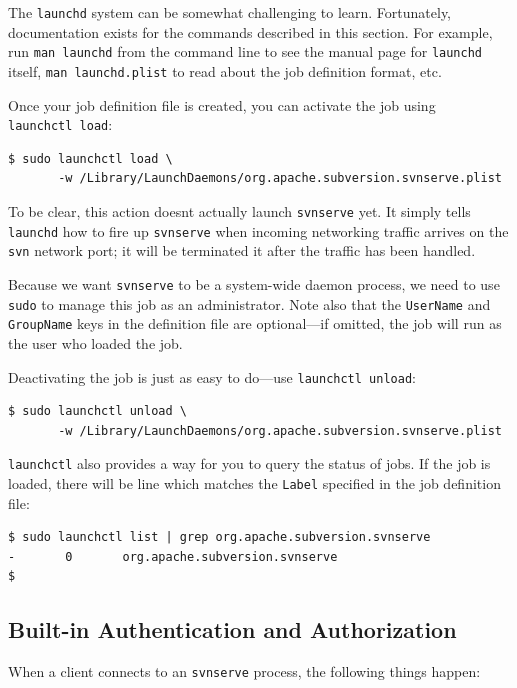 The \texttt{launchd} system can be somewhat challenging to learn.
Fortunately, documentation exists for the commands described in this
section. For example, run \texttt{man\ launchd} from the command line to
see the manual page for \texttt{launchd} itself,
\texttt{man\ launchd.plist} to read about the job definition format,
etc.

Once your job definition file is created, you can activate the job using
\texttt{launchctl\ load}:

\begin{verbatim}
$ sudo launchctl load \
       -w /Library/LaunchDaemons/org.apache.subversion.svnserve.plist
\end{verbatim}

To be clear, this action doesn\textquotesingle t actually launch
\texttt{svnserve} yet. It simply tells \texttt{launchd} how to fire up
\texttt{svnserve} when incoming networking traffic arrives on the
\texttt{svn} network port; it will be terminated it after the traffic
has been handled.

Because we want \texttt{svnserve} to be a system-wide daemon process, we
need to use \texttt{sudo} to manage this job as an administrator. Note
also that the \texttt{UserName} and \texttt{GroupName} keys in the
definition file are optional---if omitted, the job will run as the user
who loaded the job.

Deactivating the job is just as easy to do---use
\texttt{launchctl\ unload}:

\begin{verbatim}
$ sudo launchctl unload \
       -w /Library/LaunchDaemons/org.apache.subversion.svnserve.plist
\end{verbatim}

\texttt{launchctl} also provides a way for you to query the status of
jobs. If the job is loaded, there will be line which matches the
\texttt{Label} specified in the job definition file:

\begin{verbatim}
$ sudo launchctl list | grep org.apache.subversion.svnserve
-       0       org.apache.subversion.svnserve
$
\end{verbatim}

\subsection{Built-in Authentication and
Authorization}\label{svn.serverconfig.svnserve.auth}

When a client connects to an \texttt{svnserve} process, the following
things happen:

